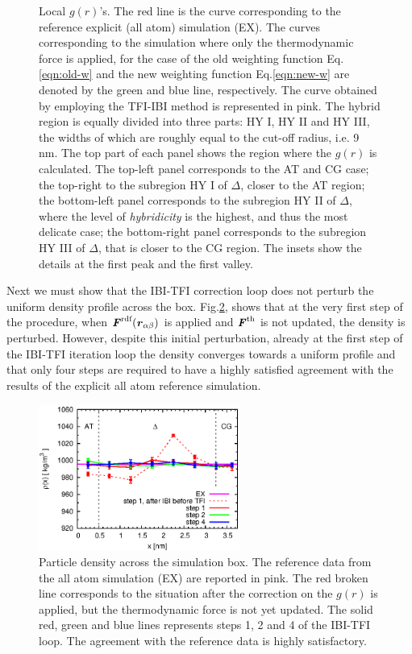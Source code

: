 \documentclass[aps,pre,preprint]{revtex4}
\renewcommand{\v}[1]{\textbf{\textit{#1}}}
\begin{document}
\begin{figure}
  \caption{Local $g(r)$'s. The red line is the curve corresponding to the reference explicit (all atom)
    simulation (EX). The curves corresponding to the simulation where only the thermodynamic force is applied, for the case of  
    the old weighting function Eq.\eqref{eqn:old-w} and
    the new weighting function Eq.\eqref{eqn:new-w} are denoted by the
    green and blue line, respectively. The curve obtained by employing the TFI-IBI
    method is represented in pink.
The hybrid region is equally
    divided into three parts: HY I, HY II and HY III, the widths of
    which are roughly equal to the cut-off radius, i.e. 9 \textsf{nm}. 
The top part of each panel shows the region where the $g(r)$ is calculated.
The top-left panel corresponds to the AT and CG case; the top-right to the subregion HY I of $\Delta$, 
closer to the AT region; the bottom-left panel corresponds to the  subregion HY II of $\Delta$, where the level of {\it hybridicity} is the highest, and thus the most delicate case; the bottom-right panel corresponds to the  subregion HY III of $\Delta$, that is closer to the CG region. The insets show the details at the first peak and the first valley.}
  \label{fig:tmp7}
\end{figure}
Next we must show that the IBI-TFI correction loop does not perturb the uniform density profile across the box. Fig.\ref{rho}, shows that at the very first step of the procedure, when $\v F^{\textrm{rdf}}(\v r_{\alpha\beta})$ is applied and ${\v F}^{\textrm{th}}$ is not updated, the density is perturbed. However, despite this initial perturbation, already at the first step of the IBI-TFI iteration loop the density converges towards a uniform profile and that only four steps are required to have a highly satisfied agreement with the results of the explicit all atom reference simulation.
\begin{figure}
  \centering
  \includegraphics[width=0.59\textwidth]{rho.eps}
  \caption{Particle density across the simulation box. The reference data from the all atom simulation (EX) are reported in pink. The red broken line corresponds to the situation after the correction on the $g(r)$ is applied, but the thermodynamic force is not yet updated. The solid red, green and blue lines represents steps 1, 2 and 4 of the IBI-TFI loop. The agreement with the reference data is highly satisfactory.}
  \label{rho}
\end{figure}
\end{document}
